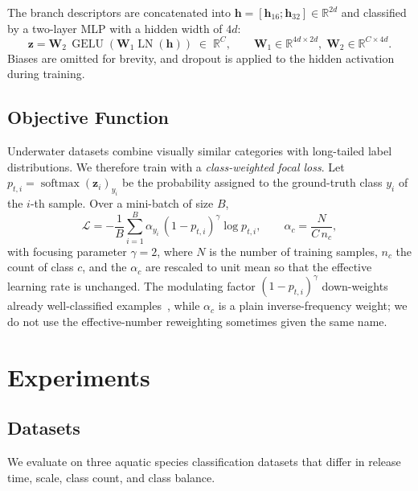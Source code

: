 \documentclass[runningheads]{llncs}
\begin{document}
The branch descriptors are concatenated into $\mathbf{h}=[\mathbf{h}_{16};\mathbf{h}_{32}]\in\mathbb{R}^{2d}$ and classified by a two-layer MLP with a hidden width of $4d$:
\begin{equation}
  \mathbf{z}
  =
  \mathbf{W}_{2}\,
  \operatorname{GELU}\!\left(\mathbf{W}_{1}\operatorname{LN}(\mathbf{h})\right)
  \;\in\; \mathbb{R}^{C},
  \qquad
  \mathbf{W}_{1}\in\mathbb{R}^{4d\times2d},\;
  \mathbf{W}_{2}\in\mathbb{R}^{C\times4d}.
  \label{eq:classifier}
\end{equation}
Biases are omitted for brevity, and dropout is applied to the hidden activation during training.

\subsection{Objective Function}
\label{sec:method-loss}

Underwater datasets combine visually similar categories with long-tailed label distributions. We therefore train with a \emph{class-weighted focal loss}. Let $p_{t,i}=\operatorname{softmax}(\mathbf{z}_i)_{y_i}$ be the probability assigned to the ground-truth class $y_i$ of the $i$-th sample. Over a mini-batch of size $B$,
\begin{equation}
  \mathcal{L}
  =
  -\frac{1}{B}\sum_{i=1}^{B}\alpha_{y_i}\,(1-p_{t,i})^{\gamma}\log p_{t,i},
  \qquad
  \alpha_c = \frac{N}{C\,n_c},
  \label{eq:focal-loss}
\end{equation}
with focusing parameter $\gamma=2$, where $N$ is the number of training samples, $n_c$ the count of class $c$, and the $\alpha_c$ are rescaled to unit mean so that the effective learning rate is unchanged. The modulating factor $(1-p_{t,i})^{\gamma}$ down-weights already well-classified examples~\cite{lin2017focal}, while $\alpha_c$ is a plain inverse-frequency weight; we do not use the effective-number reweighting sometimes given the same name.

\section{Experiments}
\label{sec:experiments}

\subsection{Datasets}
We evaluate on three aquatic species classification datasets that differ in release time, scale, class count, and class balance.
\end{document}
